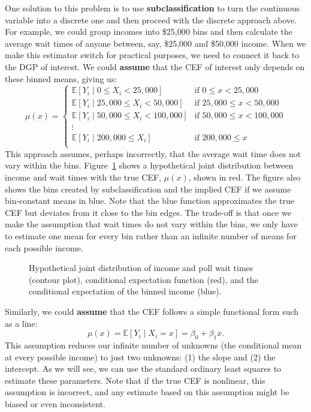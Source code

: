 \documentclass[
  13pt,
  letterpaper,
  DIV=11,
  numbers=noendperiod]{scrreprt}
\newcommand{\E}{\mathbb{E}}
\theoremstyle{plain}
\theoremstyle{definition}
\theoremstyle{definition}
\theoremstyle{remark}
\begin{document}
One solution to this problem is to use \textbf{subclassification} to
turn the continuous variable into a discrete one and then proceed with
the discrete approach above. For example, we could group incomes into
\$25,000 bins and then calculate the average wait times of anyone
between, say, \$25,000 and \$50,000 income. When we make this estimator
switch for practical purposes, we need to connect it back to the DGP of
interest. We could \textbf{assume} that the CEF of interest only depends
on these binned means, giving us:\\
\[
\mu(x) = 
\begin{cases}
  \E[Y_{i} \mid 0 \leq X_{i} < 25,000] &\text{if } 0 \leq x < 25,000 \\
  \E[Y_{i} \mid 25,000 \leq X_{i} < 50,000] &\text{if } 25,000 \leq x < 50,000\\
  \E[Y_{i} \mid 50,000 \leq X_{i} < 100,000] &\text{if } 50,000 \leq x < 100,000\\
  \vdots \\
  \E[Y_{i} \mid 200,000 \leq X_{i}] &\text{if } 200,000 \leq x\\
\end{cases}
\] This approach assumes, perhaps incorrectly, that the average wait
time does not vary within the bins. Figure~\ref{fig-cef-binned} shows a
hypothetical joint distribution between income and wait times with the
true CEF, \(\mu(x)\), shown in red. The figure also shows the bins
created by subclassification and the implied CEF if we assume
bin-constant means in blue. Note that the blue function approximates the
true CEF but deviates from it close to the bin edges. The trade-off is
that once we make the assumption that wait times do not vary within the
bins, we only have to estimate one mean for every bin rather than an
infinite number of means for each possible income.

\begin{figure}[th]


\caption{\label{fig-cef-binned}Hypothetical joint distribution of income
and poll wait times (contour plot), conditional expectation function
(red), and the conditional expectation of the binned income (blue).}

\end{figure}%

Similarly, we could \textbf{assume} that the CEF follows a simple
functional form such as a line: \[ 
\mu(x) = \E[Y_{i}\mid X_{i} = x] = \beta_{0} + \beta_{1} x.
\] This assumption reduces our infinite number of unknowns (the
conditional mean at every possible income) to just two unknowns: (1) the
slope and (2) the intercept. As we will see, we can use the standard
ordinary least squares to estimate these parameters. Note that if the
true CEF is nonlinear, this assumption is incorrect, and any estimate
based on this assumption might be biased or even inconsistent.
\end{document}

